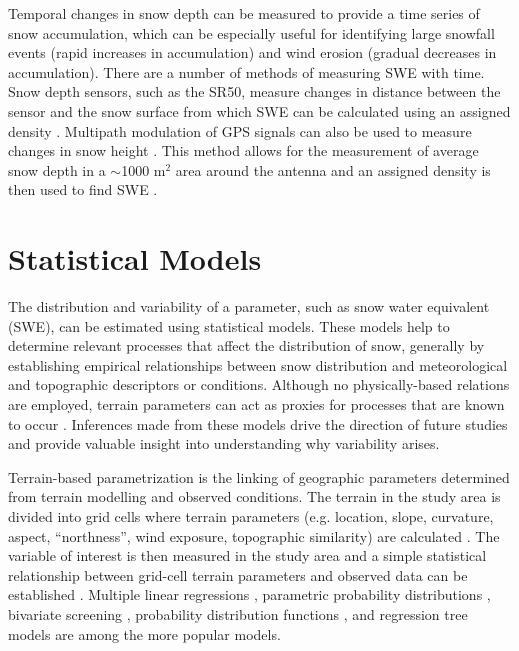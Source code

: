 \documentclass[12pt]{article}
\begin{document}
Temporal changes in snow depth can be measured to provide a time series of snow accumulation, which can be especially useful for identifying large snowfall events (rapid increases in accumulation) and wind erosion (gradual decreases in accumulation). There are a number of methods of measuring SWE with time. Snow depth sensors, such as the SR50, measure changes in distance between the sensor and the snow surface from which SWE can be calculated using an assigned density \citep{Ryan2008}. Multipath modulation of GPS signals can also be used to measure changes in snow height \citep{Larson2009,McCreight2014}. This method allows for the measurement of average snow depth in a $\sim$1000 m$^2$ area around the antenna and an assigned density is then used to find SWE \citep{McCreight2014}.

\section{Statistical Models}
The distribution and variability of a parameter, such as snow water equivalent (SWE), can be estimated using statistical models. These models help to determine relevant processes that affect the distribution of snow, generally by establishing empirical relationships between snow distribution and meteorological and topographic descriptors or conditions. Although no physically-based relations are employed, terrain parameters can act as proxies for processes that are known to occur \citep{McGrath2015}. Inferences made from these models drive the direction of future studies and provide valuable insight into understanding why variability arises.  

Terrain-based parametrization is the linking of geographic parameters determined from terrain modelling and observed conditions. The terrain in the study area is divided into grid cells where terrain parameters (e.g. location, slope, curvature, aspect, ``northness'', wind exposure, topographic similarity) are calculated \citep{Anderson2014,McGrath2015}. The variable of interest is then measured in the study area and a simple statistical relationship between grid-cell terrain parameters and observed data can be established \citep[e.g.][]{Bloschl1991, Liston1998, Anderton2004,McGrath2015}. Multiple linear regressions \citep{Marchand2005, Sold2013, McGrath2015}, parametric probability distributions \citep{Clark2011}, bivariate screening \citep{Anderton2004}, probability distribution functions \citep{Kerr2013}, and regression tree models \citep{Elder1998, Winstral2002, Molotch2005} are among the more popular models. 
\end{document}
